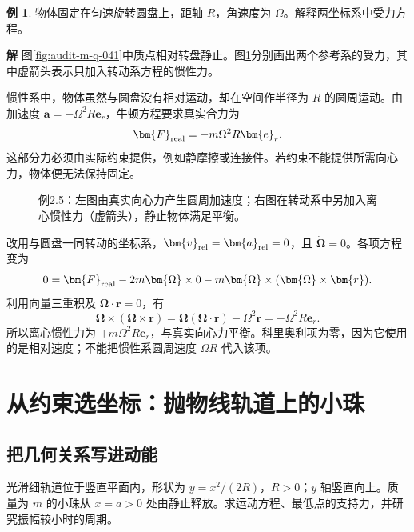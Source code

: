 \documentclass[11pt,openany,fontset=fandol]{ctexbook}
\theoremstyle{plain}\newtheorem{theorem}{定理}[chapter]\newtheorem{proposition}[theorem]{命题}
\theoremstyle{definition}\newtheorem{definition}{定义}[chapter]\newtheorem{example}{例}[chapter]
\theoremstyle{remark}\newtheorem*{remark}{说明}
\newcommand{\SolutionStart}{\par\nobreak\medskip\nobreak\noindent\textbf{解}\quad\ignorespaces}
\newenvironment{solution}{\SolutionStart}{\par\medskip}
\newcommand{\vct}[1]{\bm{#1}}\newcommand{\Rea}{\operatorname{Re}}\newcommand{\Ima}{\operatorname{Im}}
\begin{document}
\begin{example}
物体固定在匀速旋转圆盘上，距轴 $R$，角速度为 $\Omega$。解释两坐标系中受力方程。
\end{example}

\begin{solution}
图\ref{fig:audit-m-q-041}中质点相对转盘静止。图\ref{fig:eg-2-5}分别画出两个参考系的受力，其中虚箭头表示只加入转动系方程的惯性力。

惯性系中，物体虽然与圆盘没有相对运动，却在空间作半径为 $R$ 的圆周运动。由加速度 $\vct a=-\Omega^2R\vct e_r$，牛顿方程要求真实合力为
\[
\vct F_{\rm real}=-m\Omega^2R\vct e_r.
\]
这部分力必须由实际约束提供，例如静摩擦或连接件。若约束不能提供所需向心力，物体便无法保持固定。

\begin{figure}[H]\centering
{}
\caption{例2.5：左图由真实向心力产生圆周加速度；右图在转动系中另加入离心惯性力（虚箭头），静止物体满足平衡。}\label{fig:eg-2-5}
\end{figure}

改用与圆盘一同转动的坐标系，$\vct v_{\rm rel}=\vct a_{\rm rel}=0$，且 $\dot{\vct\Omega}=0$。各项方程变为
\[
0=\vct F_{\rm real}-2m\vct\Omega\times0
-m\vct\Omega\times(\vct\Omega\times\vct r).
\]
利用向量三重积及 $\vct\Omega\cdot\vct r=0$，有
\[
\vct\Omega\times(\vct\Omega\times\vct r)
=\vct\Omega(\vct\Omega\cdot\vct r)-\Omega^2\vct r
=-\Omega^2R\vct e_r.
\]
所以离心惯性力为 $+m\Omega^2R\vct e_r$，与真实向心力平衡。科里奥利项为零，因为它使用的是相对速度；不能把惯性系圆周速度 $\Omega R$ 代入该项。

\end{solution}

\section{从约束选坐标：抛物线轨道上的小珠}
\subsection{把几何关系写进动能}
光滑细轨道位于竖直平面内，形状为 $y=x^2/(2R)$，$R>0$；$y$ 轴竖直向上。质量为 $m$ 的小珠从 $x=a>0$ 处由静止释放。求运动方程、最低点的支持力，并研究振幅较小时的周期。
\end{document}
